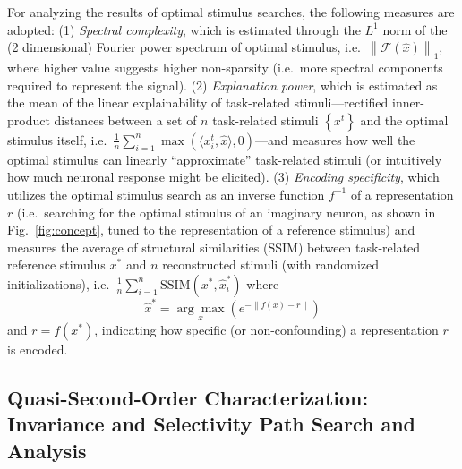 For analyzing the results of optimal stimulus searches, the following measures are adopted: (1) \emph{Spectral complexity}, which is estimated through the $L^{1}$ norm of the (2 dimensional) Fourier power spectrum of optimal stimulus, i.e.~$\left\| \mathcal{F}(\hat{x}) \right\|_{1}$, where higher value suggests higher non-sparsity (i.e.~more spectral components required to represent the signal). (2) \emph{Explanation power}, which is estimated as the mean of the linear explainability of task-related stimuli---rectified inner-product distances between a set of $n$ task-related stimuli $\left\lbrace x^{t} \right\rbrace$ and the optimal stimulus itself, i.e.~$\frac{1}{n}\sum_{i=1}^{n}\max\left(\langle x^{t}_{i} , \hat{x} \rangle , 0\right)$---and measures how well the optimal stimulus can linearly ``approximate'' task-related stimuli (or intuitively how much neuronal response might be elicited). (3) \emph{Encoding specificity}, which utilizes the optimal stimulus search as an inverse function $f^{-1}$ of a representation $r$ (i.e.~searching for the optimal stimulus of an imaginary neuron, as shown in Fig.~\ref{fig:concept}, tuned to the representation of a reference stimulus) and measures the average of structural similarities (SSIM) \cite{wang2004image} between task-related reference stimulus $x^{*}$ and $n$ reconstructed stimuli (with randomized initializations), i.e.~$\frac{1}{n}\sum_{i=1}^{n} \mathrm{SSIM}\left(x^{*} , \hat{x}^{*}_{i} \right)$ where \begin{equation} \label{eq:O2} \hat{x}^{*} = \underset{x}{\arg\max} \left( e^{-\left\|f\left(x\right)-r\right\|} \right) \end{equation} and $r = f\left(x^{*}\right)$, indicating how specific (or non-confounding) a representation $r$ is encoded.


\subsection*{Quasi-Second-Order Characterization: Invariance and Selectivity Path Search and Analysis}

